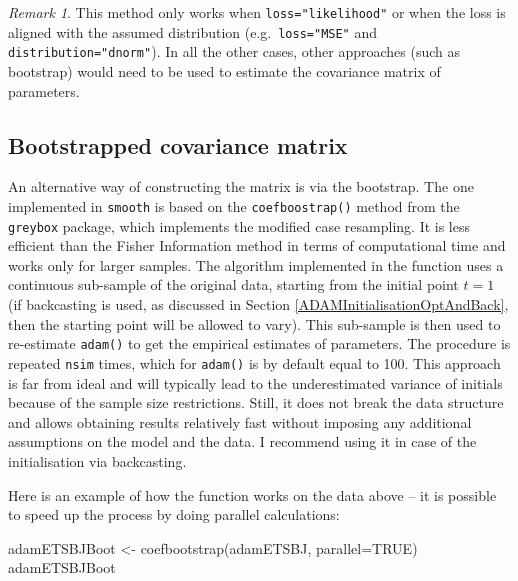 \documentclass[
]{book}
\newenvironment{Shaded}{\begin{snugshade}}{\end{snugshade}}
\newcommand{\AttributeTok}[1]{\textcolor[rgb]{0.77,0.63,0.00}{#1}}
\newcommand{\ConstantTok}[1]{\textcolor[rgb]{0.00,0.00,0.00}{#1}}
\newcommand{\FunctionTok}[1]{\textcolor[rgb]{0.00,0.00,0.00}{#1}}
\newcommand{\NormalTok}[1]{#1}
\newcommand{\OtherTok}[1]{\textcolor[rgb]{0.56,0.35,0.01}{#1}}
\theoremstyle{definition}
\theoremstyle{definition}
\theoremstyle{definition}
\theoremstyle{definition}
\theoremstyle{remark}
\newtheorem*{remark}{Remark}
\begin{document}
\begin{remark}
This method only works when \texttt{loss="likelihood"} or when the loss is aligned with the assumed distribution (e.g.~\texttt{loss="MSE"} and \texttt{distribution="dnorm"}). In all the other cases, other approaches (such as bootstrap) would need to be used to estimate the covariance matrix of parameters.
\end{remark}

\hypertarget{bootstrapped-covariance-matrix}{%
\subsection{Bootstrapped covariance matrix}\label{bootstrapped-covariance-matrix}}

An alternative way of constructing the matrix is via the bootstrap. The one implemented in \texttt{smooth} is based on the \texttt{coefboostrap()} method from the \texttt{greybox} package, which implements the modified case resampling. It is less efficient than the Fisher Information method in terms of computational time and works only for larger samples. The algorithm implemented in the function uses a continuous sub-sample of the original data, starting from the initial point \(t=1\) (if backcasting is used, as discussed in Section \ref{ADAMInitialisationOptAndBack}, then the starting point will be allowed to vary). This sub-sample is then used to re-estimate \texttt{adam()} to get the empirical estimates of parameters. The procedure is repeated \texttt{nsim} times, which for \texttt{adam()} is by default equal to 100. This approach is far from ideal and will typically lead to the underestimated variance of initials because of the sample size restrictions. Still, it does not break the data structure and allows obtaining results relatively fast without imposing any additional assumptions on the model and the data. I recommend using it in case of the initialisation via backcasting.

Here is an example of how the function works on the data above -- it is possible to speed up the process by doing parallel calculations:

\begin{Shaded}
\begin{Highlighting}[]
\NormalTok{adamETSBJBoot }\OtherTok{\textless{}{-}} \FunctionTok{coefbootstrap}\NormalTok{(adamETSBJ, }\AttributeTok{parallel=}\ConstantTok{TRUE}\NormalTok{)}
\NormalTok{adamETSBJBoot}
\end{Highlighting}
\end{Shaded}
\end{document}
